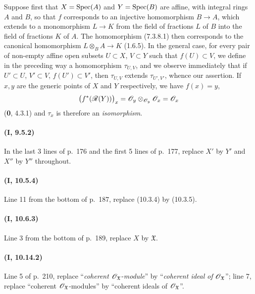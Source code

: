 Suppose first that $X=\operatorname{Spec}(A)$ and $Y=\operatorname{Spec}(B)$ are affine, with
integral rings $A$ and $B$, so that $f$ corresponds to an injective
homomorphism $B\to A$, which extends to a monomorphism $L\to K$ from the
field of fractions $L$ of $B$ into the field of fractions $K$ of $A$.
The homomorphism (7.3.8.1) then corresponds to the canonical homomorphism $L\otimes_B A\to K$
(1.6.5). In the general case, for every pair of non-empty affine open
subsets $U\subset X$, $V\subset Y$ such that $f(U)\subset V$, we define
in the preceding way a homomorphism $\tau_{U,V}$, and we observe
immediately that if $U'\subset U$, $V'\subset V$,
$f(U')\subset V'$, then $\tau_{U,V}$ extends $\tau_{U',V'}$, whence our
assertion. If $x,y$ are the generic points of $X$ and $Y$
respectively, we have $f(x)=y$,
\[
  \bigl(f^*(\mathscr{R}(Y))\bigr)_x
  =\mathscr{O}_y\otimes_{\mathscr{O}_y}\mathscr{O}_x
  =\mathscr{O}_x
\]
(\textbf{0}, 4.3.1) and $\tau_x$ is therefore an \emph{isomorphism}.

\paragraph{(\textbf{I}, 9.5.2)}
In the last 3 lines of p.~176 and the first 5 lines of
p.~177, replace $X'$ by $Y'$ and $X''$ by $Y''$ throughout.

\paragraph{(\textbf{I}, 10.5.4)}
Line 11 from the bottom of p.~187, replace (10.3.4) by (10.3.5).

\paragraph{(\textbf{I}, 10.6.3)}
Line 3 from the bottom of p.~189, replace $X$ by $\mathfrak X$.

\paragraph{(\textbf{I}, 10.14.2)}
Line 5 of p.~210, replace ``\emph{coherent} $\mathscr{O}_{\mathfrak X}$-\emph{module}'' by
``\emph{coherent ideal of} $\mathscr{O}_{\mathfrak X}$''; line 7, replace
``coherent $\mathscr{O}_{\mathfrak X}$-modules'' by ``coherent ideals of
$\mathscr{O}_{\mathfrak X}$''.
